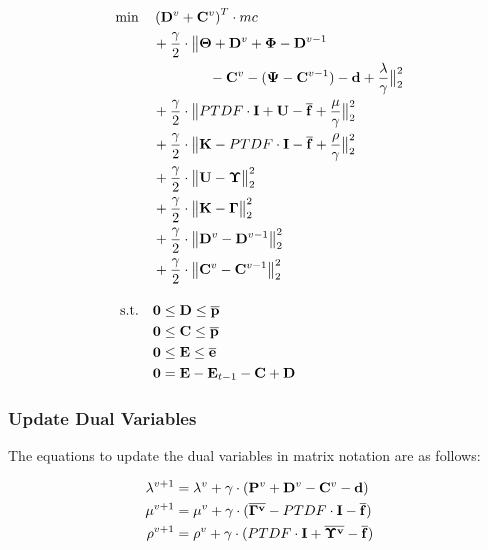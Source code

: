  \begin{subequations}
	\begin{align}
		 \min \quad & \left(\vb{D}^v + \vb{C}^v\right)^T \cdot mc\\
		 & + \frac{\gamma}{2} \cdot \big\| \vb{\Theta} + \vb{D}^v + \vb{\Phi} - \vb{D}^{v-1} \nonumber \\
		 & \qquad \qquad - \vb{C}^v - (\vb{\Psi} - \vb{C}^{v-1}) - \vb{d} + \frac{\vb{\lambda}}{\gamma} \big\|^2_2 \nonumber \\
		 & + \frac{\gamma}{2} \cdot \big\| PTDF \cdot \vb{I} + \vb{U} - \vb{\overline{f}} + \frac{\vb{\mu}}{\gamma}\big\|^2_2 \nonumber \\
		 & + \frac{\gamma}{2} \cdot \big\| \vb{K} - PTDF \cdot \vb{I} - \vb{\overline{f}} + \frac{\vb{\rho}}{\gamma}\big\|^2_2 \nonumber \\
		 & + \frac{\gamma}{2} \cdot \big\| \vb{U} - \vb{\Upsilon} \big\|^2_2 \nonumber\\
		 & + \frac{\gamma}{2} \cdot \big\| \vb{K} - \vb{\Gamma} \big\|^2_2 \nonumber \\
		 & + \frac{\gamma}{2} \cdot \big\| \vb{D}^v - \vb{D}^{v-1}\big\|^2_2 \nonumber \\
		 & + \frac{\gamma}{2} \cdot \big\| \vb{C}^v - \vb{C}^{v-1}\big\|^2_2 \nonumber \\[10pt]
		 \text{s.t.} \quad & \vb{0} \leq \vb{D} \leq \vb{\overline{p}} \\
		 & \vb{0} \leq \vb{C} \leq \vb{\overline{p}} \\
		 & \vb{0} \leq \vb{E} \leq \vb{\overline{e}}\\
		 & \vb{0} = \vb{E} - \vb{E}_{t-1} - \vb{C} + \vb{D}
	\end{align}
\end{subequations}

\subsubsection*{Update Dual Variables}

The equations to update the dual variables in matrix notation are as follows:

\begin{subequations}
	\begin{align}
		\lambda^{v+1} &= \lambda^{v} + \gamma \cdot (\vb{P}^v + \vb{D}^{v} - \vb{C}^v - \vb{d}) \\
		\mu^{v+1} &= \mu^{v} + \gamma \cdot (\vb{\overline{\Gamma^v}} - PTDF \cdot \vb{I} - \vb{\overline{f}}) \\
		\rho^{v+1} &= \rho^{v} + \gamma \cdot (PTDF \cdot \vb{I} + \vb{\overline{\Upsilon^v}} - \vb{\overline{f}})
	\end{align}
\end{subequations}


